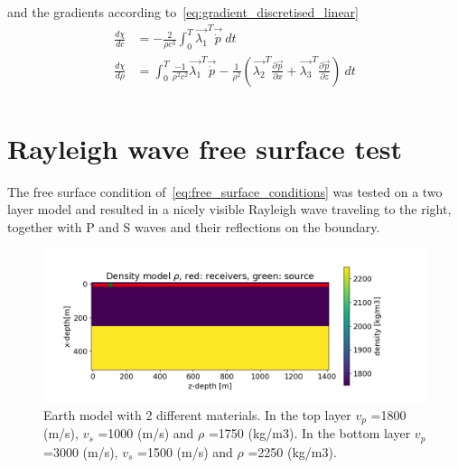 \documentclass[10pt]{SelfArx} %
\newcommand{\pder}[2][]{\frac{\partial#1}{\partial#2}}
\theoremstyle{definition}
\begin{document}
and the gradients according to~\cref{eq:gradient_discretised_linear}
\begin{equation}
\begin{aligned}
\frac{d\chi}{dc} &=-\frac{2}{\rho c^3} \int_0^T\vec{\lambda_1}^T\vec{\dot{p}} \ dt \\
\frac{d\chi}{d\rho} &= \int_0^T \frac{-1}{\rho^2 c^2} \vec{\lambda_1}^T \vec{\dot{p}} - \frac{1}{\rho^2}\left(\vec{\lambda_2}^T \pder[\vec{p}]{x} + \vec{\lambda_3}^T \pder[\vec{p}]{z}\right)\  dt\\
\end{aligned}
\end{equation}
\clearpage
\section{Rayleigh wave free surface test}\label{sec:rayleigh_wave_test}
The free surface condition of~\cref{eq:free_surface_conditions} was tested on a two layer model and resulted in a nicely visible Rayleigh wave traveling to the right, together with P and S waves and their reflections on the boundary.
\begin{figure}[h]\label{fig:rayleigh_model}
\includegraphics[width=\textwidth]{fig/rayleigh_model}
\caption{Earth model with 2 different materials. In the top layer $v_p$ =1800 (m/s), $v_s$ =1000 (m/s) and $\rho$ =1750 (kg/m3). In the bottom layer $v_p$ =3000 (m/s), $v_s$ =1500 (m/s) and $\rho$ =2250 (kg/m3).
}
\end{figure}
\clearpage
\end{document}
